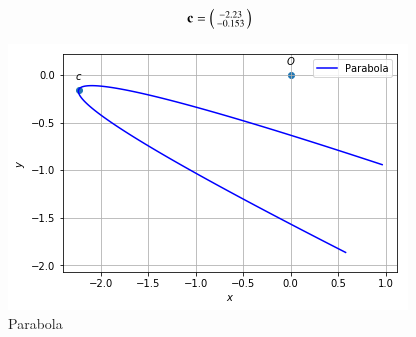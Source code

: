 \documentclass[journal,12pt,twocolumn]{IEEEtran}
\begin{document}
\begin{align}
	\mathbf{c}=\begin{psmallmatrix} -2.23\\-0.153\end{psmallmatrix} 
\end{align}
\begin{figure}[!htbp]
	\centering
	\includegraphics[width =\columnwidth]{parabola.png}
	\caption{Parabola }
	\label{fig:1}
\end{figure}	
\end{document}
